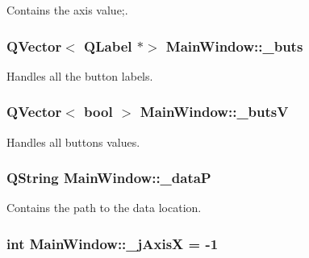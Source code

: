 Contains the axis value;. 

\hypertarget{a00004_a8eaf474e1b8672f32873ed009e28ce8a}{}
\subsubsection[{\+\_\+buts}]{\setlength{\rightskip}{0pt plus 5cm}Q\+Vector$<$ Q\+Label $\ast$$>$ Main\+Window\+::\+\_\+buts\hspace{0.3cm}{\ttfamily [private]}}\label{a00004_a8eaf474e1b8672f32873ed009e28ce8a}


Handles all the button labels. 

\hypertarget{a00004_a519ae4630572cb63fbd04bce12fe8e77}{}
\subsubsection[{\+\_\+buts\+V}]{\setlength{\rightskip}{0pt plus 5cm}Q\+Vector$<$ bool $>$ Main\+Window\+::\+\_\+buts\+V\hspace{0.3cm}{\ttfamily [private]}}\label{a00004_a519ae4630572cb63fbd04bce12fe8e77}


Handles all buttons values. 

\hypertarget{a00004_aaccbe653019df03668429890e325ac21}{}
\subsubsection[{\+\_\+data\+P}]{\setlength{\rightskip}{0pt plus 5cm}Q\+String Main\+Window\+::\+\_\+data\+P\hspace{0.3cm}{\ttfamily [private]}}\label{a00004_aaccbe653019df03668429890e325ac21}


Contains the path to the data location. 

\hypertarget{a00004_a282d4090e96c676578c4336391b1af08}{}
\subsubsection[{\+\_\+j\+Axis\+X}]{\setlength{\rightskip}{0pt plus 5cm}int Main\+Window\+::\+\_\+j\+Axis\+X = -\/1\hspace{0.3cm}{\ttfamily [private]}}\label{a00004_a282d4090e96c676578c4336391b1af08}


